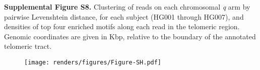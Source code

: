 \documentclass{article}
\begin{document}
\begin{samepage}

\noindent \textbf{Supplemental Figure S8.}
Clustering of reads on each chromosomal \textit{q} arm by pairwise Levenshtein distance, for each subject (HG001 through HG007), and densities of top four enriched motifs along each read in the telomeric region.
Genomic coordinates are given in Kbp, relative to the boundary of the annotated telomeric tract.

\begin{figure}[h!] \centering
\texttt{[image: renders/figures/Figure-SH.pdf]}
\end{figure}

\end{samepage}
\end{document}
